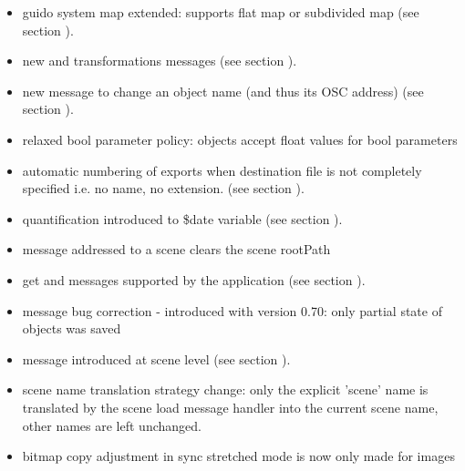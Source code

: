 \begin{itemize}
\item guido system map extended: supports flat map or subdivided map (see section ).
\item new  and  transformations messages (see section ).
\item new  message to change an object name (and thus its OSC address) (see section ).
\item relaxed bool parameter policy: objects accept float values for bool parameters 
\item automatic numbering of exports when destination file is not completely specified 
  i.e. no name, no extension. (see section ).
\item quantification introduced to \$date variable (see section ).
\item {} message addressed to a scene clears the scene rootPath
\end{itemize}

\begin{itemize}
\item  get  and  messages supported by the application (see section ).
\item  {} message bug correction - introduced with version 0.70: only partial state of objects was saved
\item  {} message introduced at scene level (see section ).
\item  scene name translation strategy change: only the explicit 'scene' name is 
  translated by the scene load message handler into the current scene name, 
  other names are left unchanged.
\item  bitmap copy adjustment in sync stretched mode is now only made for images
\end{itemize}


